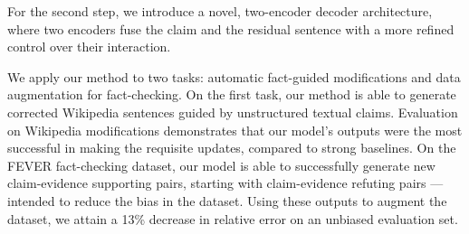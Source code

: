 \documentclass[letterpaper]{article} %
\begin{document}
For the second step, we introduce a novel, two-encoder decoder architecture, where two encoders fuse the claim and the residual sentence with a more refined control over their interaction.


We apply our method to two tasks: automatic fact-guided modifications and data augmentation for fact-checking. On the first task, our method is able to generate corrected Wikipedia sentences guided by unstructured textual claims. Evaluation on Wikipedia modifications demonstrates that our model's outputs were the most successful in making the requisite updates, compared to strong baselines. On the FEVER fact-checking dataset, our model is able to successfully generate new claim-evidence supporting pairs, starting with claim-evidence refuting pairs --- intended to reduce the bias in the dataset. Using these outputs to augment the dataset, we attain a 13\% decrease in relative error on an unbiased evaluation set.
% 


\end{document}
